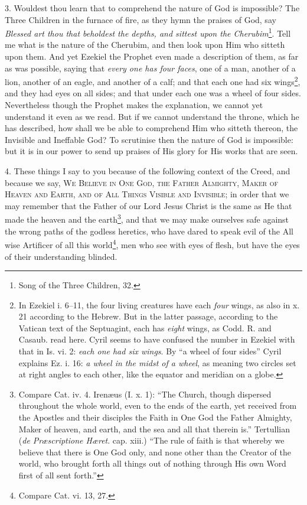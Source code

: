 3. Wouldest thou learn that to comprehend the nature of God is impossible? The Three Children in the furnace of fire, as they hymn the praises of God, say \emph{Blessed art thou that beholdest the depths, and sittest upon the Cherubim}\footnote{Song of the Three Children, 32.}. Tell me what is the nature of the Cherubim, and then look upon Him who sitteth upon them. And yet Ezekiel the Prophet even made a description of them, as far as was possible, saying that \emph{every one has four faces}, one of a man, another of a lion, another of an eagle, and another of a calf; and that each one had six wings\footnote{In Ezekiel i. 6–11, the four living creatures have each \emph{four} wings, as also in x. 21 according to the Hebrew. But in the latter passage, according to the Vatican text of the Septuagint, each has \emph{eight} wings, as Codd. R. and Casaub. read here. Cyril seems to have confused the number in Ezekiel with that in Is. vi. 2: \emph{each one had six wings}. By “a wheel of four sides” Cyril explains Ez. i. 16: \emph{a wheel in the midst of a wheel}, as meaning two circles set at right angles to each other, like the equator and meridian on a globe.}, and they had eyes on all sides; and that under each one was a wheel of four sides. Nevertheless though the Prophet makes the explanation, we cannot yet understand it even as we read. But if we cannot understand the throne, which he has described, how shall we be able to comprehend Him who sitteth thereon, the Invisible and Ineffable God? To scrutinise then the nature of God is impossible: but it is in our power to send up praises of His glory for His works that are seen.

4. These things I say to you because of the following context of the Creed, and because we say, \textsc{We Believe in One God, the Father Almighty, Maker of Heaven and Earth, and of All Things Visible and Invisible;} in order that we may remember that the Father of our Lord Jesus Christ is the same as He that made the heaven and the earth\footnote{Compare Cat. iv. 4. Irenæus (I. x. 1): “The Church, though dispersed throughout the whole world, even to the ends of the earth, yet received from the Apostles and their disciples the Faith in One God the Father Almighty, Maker of heaven, and earth, and the sea and all that therein is.” Tertullian (\emph{de Præscriptione Hæret}. cap. xiii.) “The rule of faith is that whereby we believe that there is One God only, and none other than the Creator of the world, who brought forth all things out of nothing through His own Word first of all sent forth.”}, and that we may make ourselves safe against the wrong paths of the godless heretics, who have dared to speak evil of the All wise Artificer of all this world\footnote{Compare Cat. vi. 13, 27.}, men who see with eyes of flesh, but have the eyes of their understanding blinded.

